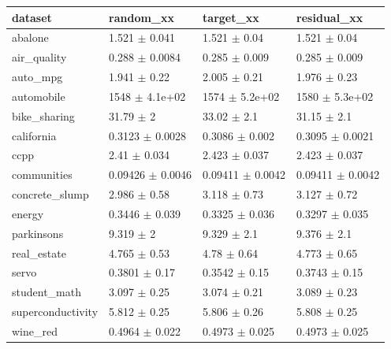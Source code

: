 \begin{tabular}{llll}
\toprule
dataset & random\_xx & target\_xx & residual\_xx \\
\midrule
abalone & 1.521 $\pm$ 0.041 & 1.521 $\pm$ 0.04 & 1.521 $\pm$ 0.04 \\
air\_quality & 0.288 $\pm$ 0.0084 & 0.285 $\pm$ 0.009 & 0.285 $\pm$ 0.009 \\
auto\_mpg & 1.941 $\pm$ 0.22 & 2.005 $\pm$ 0.21 & 1.976 $\pm$ 0.23 \\
automobile & 1548 $\pm$ 4.1e+02 & 1574 $\pm$ 5.2e+02 & 1580 $\pm$ 5.3e+02 \\
bike\_sharing & 31.79 $\pm$ 2 & 33.02 $\pm$ 2.1 & 31.15 $\pm$ 2.1 \\
california & 0.3123 $\pm$ 0.0028 & 0.3086 $\pm$ 0.002 & 0.3095 $\pm$ 0.0021 \\
ccpp & 2.41 $\pm$ 0.034 & 2.423 $\pm$ 0.037 & 2.423 $\pm$ 0.037 \\
communities & 0.09426 $\pm$ 0.0046 & 0.09411 $\pm$ 0.0042 & 0.09411 $\pm$ 0.0042 \\
concrete\_slump & 2.986 $\pm$ 0.58 & 3.118 $\pm$ 0.73 & 3.127 $\pm$ 0.72 \\
energy & 0.3446 $\pm$ 0.039 & 0.3325 $\pm$ 0.036 & 0.3297 $\pm$ 0.035 \\
parkinsons & 9.319 $\pm$ 2 & 9.329 $\pm$ 2.1 & 9.376 $\pm$ 2.1 \\
real\_estate & 4.765 $\pm$ 0.53 & 4.78 $\pm$ 0.64 & 4.773 $\pm$ 0.65 \\
servo & 0.3801 $\pm$ 0.17 & 0.3542 $\pm$ 0.15 & 0.3743 $\pm$ 0.15 \\
student\_math & 3.097 $\pm$ 0.25 & 3.074 $\pm$ 0.21 & 3.089 $\pm$ 0.23 \\
superconductivity & 5.812 $\pm$ 0.25 & 5.806 $\pm$ 0.26 & 5.808 $\pm$ 0.25 \\
wine\_red & 0.4964 $\pm$ 0.022 & 0.4973 $\pm$ 0.025 & 0.4973 $\pm$ 0.025 \\
\bottomrule
\end{tabular}
